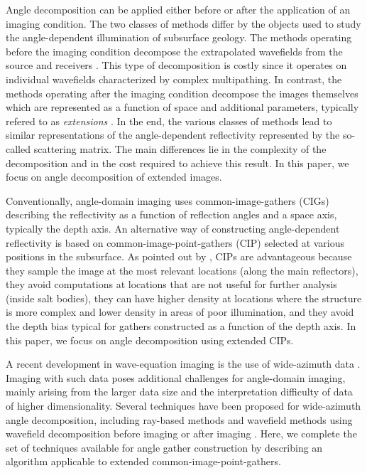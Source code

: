 Angle decomposition can be applied either before or after the
application of an imaging condition. The two classes of methods differ
by the objects used to study the angle-dependent illumination of
subsurface geology. The methods operating before the imaging condition
decompose the extrapolated wavefields from the source and receivers
\cite[]{GEO55-09-12231234,SEG-1997-1379,SEG-1999-08240827,Wu.directionalIllumination}.
This type of decomposition is costly since it operates on individual
wavefields characterized by complex multipathing.  In contrast, the
methods operating after the imaging condition decompose the images
themselves which are represented as a function of space and additional
parameters, typically refered to as {\it extensions}
\cite[]{RickettSava.geo.img,SavaFomel.geo.ang,SavaFomel.geo.tsic,SavaVasconcelos.gpr.eic}.
In the end, the various classes of methods lead to similar
representations of the angle-dependent reflectivity represented by the
so-called scattering matrix. The main differences lie in the
complexity of the decomposition and in the cost required to achieve
this result. In this paper, we focus on angle decomposition of
extended images.


Conventionally, angle-domain imaging uses common-image-gathers (CIGs)
describing the reflectivity as a function of reflection angles and a
space axis, typically the depth axis. An alternative way of
constructing angle-dependent reflectivity is based on
common-image-point-gathers (CIP) selected at various positions in the
subsurface. As pointed out by \cite{SavaVasconcelos.gpr.eic}, CIPs are
advantageous because they sample the image at the most relevant
locations (along the main reflectors), they avoid computations at
locations that are not useful for further analysis (inside salt
bodies), they can have higher density at locations where the structure
is more complex and lower density in areas of poor illumination, and
they avoid the depth bias typical for gathers constructed as a
function of the depth axis. In this paper, we focus on angle
decomposition using extended CIPs.


A recent development in wave-equation imaging is the use of
wide-azimuth data \cite[]{regone:2896,michell:2905,clarke:1128}.
Imaging with such data poses additional challenges for angle-domain
imaging, mainly arising from the larger data size and the
interpretation difficulty of data of higher dimensionality.  Several
techniques have been proposed for wide-azimuth angle decomposition,
including ray-based methods \cite[]{KorenEtAl.localAngle} and
wavefield methods using wavefield decomposition before imaging
\cite[]{ZhuWu.localImageMatrices,GPR52-06-05750591} or after imaging
\cite[]{SavaFomel.segab2.2005}. Here, we complete the set of
techniques available for angle gather construction by describing an
algorithm applicable to extended common-image-point-gathers.

